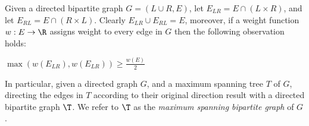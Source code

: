 \label{sec:bipartition}
Given a directed bipartite graph $G = (L\cup R, E)$, 
let $E_{LR} = E \cap (L \times R)$, 
and let $E_{RL} = E \cap (R \times L)$.
Clearly $E_{LR} \cup E_{RL} = E$, moreover, 
if a weight function $w:E \rightarrow \R$ 
assigns weight to every edge in $G$ then the following observation holds:
\begin{observation}
\label{ob:bipartition}
$\max(w(E_{LR}), w(E_{LR})) \geq \frac{w(E)}{2}$
\end{observation}

In particular, given a directed graph $G$, 
and a maximum spanning tree $T$ of $G$, 
directing the edges in $T$ according to their original direction result 
with a directed bipartite graph $\T$.
We refer to $\T$ as the \emph{maximum spanning bipartite graph}
of $G$.